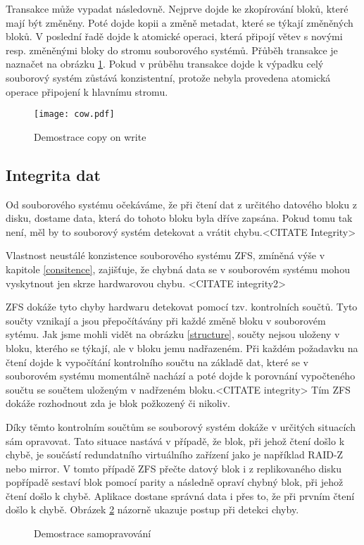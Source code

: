 Transakce může vypadat následovně. Nejprve dojde ke zkopírování bloků, které mají být změněny. Poté dojde kopii a změně metadat, které se týkají změněných bloků. V poslední
řadě dojde k atomické operaci, která připojí větev s novými resp. změněnými bloky do stromu souborového systémů. Přůběh transakce je naznačet na obrázku \ref{cow}. Pokud v průběhu transakce dojde k výpadku celý souborový systém zůstává konzistentní, protože nebyla provedena atomická operace připojení k hlavnímu stromu.
\begin{figure}[h]
    \caption{Demostrace copy on write}
    \label{cow}
    \texttt{[image: cow.pdf]}
\end{figure}
\subsection{Integrita dat}
\label{checksum}
Od souborového systému očekáváme, že při čtení dat z určitého datového bloku z disku, dostame data, která do tohoto bloku byla dříve zapsána. Pokud tomu tak není, měl by to souborový systém detekovat a vrátit chybu.<CITATE Integrity>

Vlastnost neustálé konzistence souborového systému ZFS, zmíněná výše v kapitole \ref{consitence}, zajišťuje, že chybná data se v souborovém systému mohou vyskytnout jen skrze hardwarovou chybu. <CITATE integrity2>

ZFS dokáže tyto chyby hardwaru detekovat pomocí tzv. kontrolních součtů. Tyto součty vznikají a jsou přepočítávány při každé změně bloku v souborovém sytému. Jak jsme mohli vidět na obrázku \ref{structure}, součty nejsou uloženy v bloku, kterého se týkají, ale v bloku jemu nadřazeném. Při každém požadavku na čtení dojde k vypočítání kontrolního součtu na základě dat, které se v souborovém systému momentálně nachází a poté dojde k porovnání vypočteného součtu se součtem uloženým v nadřzeném bloku.<CITATE integrity> Tím ZFS dokáže rozhodnout zda je blok požkozený či nikoliv.

Díky těmto kontrolním součtům se souborový systém dokáže v určitých situacích sám opravovat. Tato situace nastává v případě, že blok, při jehož čtení došlo k chybě, je součástí redundatního virtuálního zařízení jako je například RAID-Z nebo mirror. V tomto případě ZFS přečte datový blok i z replikovaného disku popřípadě sestaví blok pomocí parity a následně opraví chybný blok, při jehož čtení došlo k chybě. Aplikace dostane správná data i přes to, že při prvním čtení došlo k chybě. Obrázek \ref{selfhealing} názorně ukazuje postup při detekci chyby.
\begin{figure}[h]
    \caption{Demostrace samopravování}
    \label{selfhealing}
\end{figure}

